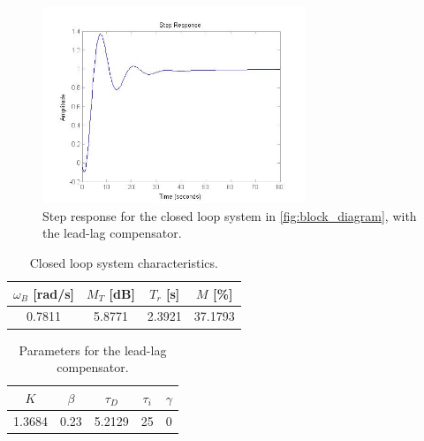 \documentclass[a4paper]{article}
\begin{document}
\begin{figure}[h!]
	\begin{center}
		\includegraphics[width=0.7\textwidth]{Step_Gc_1}
	\end{center}
	\caption{Step response for the closed loop system in \cref{fig:block_diagram}, with the lead-lag compensator.}
	\label{fig:step_response}
\end{figure}

\begin{table}[h!]
\begin{center}
	\begin{tabular}{|c|c|c|c|}
		\hline
		$\omega_B$ [rad/s] & $M_T$ [dB] & $T_r$ [s] & $M$ [\%] \\
		\hline
		0.7811 & 5.8771 & 2.3921 & 37.1793\\
		\hline
	\end{tabular}
\end{center}
\caption{Closed loop system characteristics.}
\label{tb:response}
\end{table}

\begin{table}[h!]
\begin{center}
	\begin{tabular}{|c|c|c|c|c|}
		\hline
		$K$ & $\beta$ & $\tau_D$ & $\tau_i$ & $\gamma$\\
		\hline
		1.3684 & 0.23 & 5.2129 & 25 & 0\\
		\hline
	\end{tabular}
\end{center}
\caption{Parameters for the lead-lag compensator.}
\label{tb:lead_lag_parameters}
\end{table}
\end{document}
